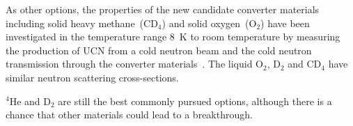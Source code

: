 As other options, the properties of the new candidate converter
materials including solid heavy methane~(CD$_4$) and solid
oxygen~(O$_2$) have been investigated in the temperature range 8~K to
room temperature by measuring the production of UCN from a cold
neutron beam and the cold neutron transmission through the converter
materials~\cite{Atchison2009}. The liquid O$_2$, D$_2$ and CD$_4$ have
similar neutron scattering cross-sections.

$^4$He and D$_2$ are still the best commonly pursued options, although
there is a chance that other materials could lead to a breakthrough.













